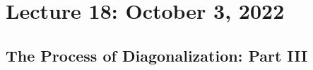 \begin{comment}
                    0 & 0 & 0 & | & 0.
                \end{bmatrix}.
            \end{equation*}
            Now, \(E_{\lambda_1}=\left\{\begin{bmatrix} -c \\ c \\ c \end{bmatrix}:c\in\mathbb{R}\right\}\). For \(\lambda_2\), we have 
            \begin{equation*}
                \begin{bmatrix}
                    -6 & 8 & -12 & | & 0 \\
                    6 & -8 & 12 & | & 0 \\
                    6 & -8 & 12 & | & 0
                \end{bmatrix},
            \end{equation*}
            which can be reduced to
            \begin{equation*}
                \begin{bmatrix}
                    1 & -\frac{4}{3} & 2 & | & 0 \\
                    0 & 0 & 0 & | & 0 \\
                    0 & 0 & 0 & | & 0
                \end{bmatrix}.
            \end{equation*}
            After removing fractions, we have
            \begin{equation*}
                \begin{bmatrix}
                    3 & -4 & 6 & | & 0 \\
                    0 & 0 & 0 & | & 0 \\
                    0 & 0 & 0 & | & 0
                \end{bmatrix}.
            \end{equation*}
        \end{example}
    \end{comment}

\pagebreak

\section{Lecture 18: October 3, 2022}

    \subsection{The Process of Diagonalization: Part III}


